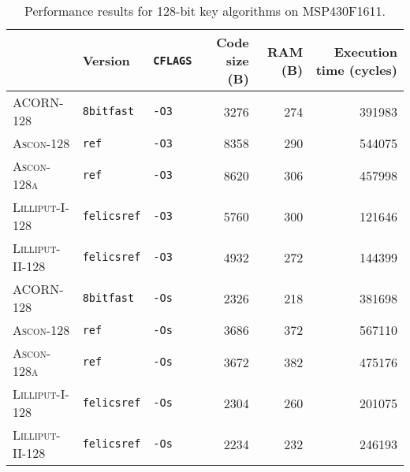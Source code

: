 \begin{table}[H]
  \centering
  \begin{tabular}{l|l|l||r|r|r}
      \textbf{}                & \textbf{Version}   & \textbf{\texttt{CFLAGS}} & \textbf{Code size (B)} & \textbf{RAM (B)} & \textbf{Execution time (cycles)} \\ \hline
      \textsc{ACORN-128}       & \texttt{8bitfast}  & \texttt{-O3}             &                   3276 &              274 &                           391983 \\ \hline
      \textsc{Ascon-128}       & \texttt{ref}       & \texttt{-O3}             &                   8358 &              290 &                           544075 \\ \hline
      \textsc{Ascon-128a}      & \texttt{ref}       & \texttt{-O3}             &                   8620 &              306 &                           457998 \\ \hline
      \textsc{Lilliput-I-128}  & \texttt{felicsref} & \texttt{-O3}             &                   5760 &              300 &                           121646 \\ \hline
      \textsc{Lilliput-II-128} & \texttt{felicsref} & \texttt{-O3}             &                   4932 &              272 &                           144399 \\ \hline
      \textsc{ACORN-128}       & \texttt{8bitfast}  & \texttt{-Os}             &                   2326 &              218 &                           381698 \\ \hline
      \textsc{Ascon-128}       & \texttt{ref}       & \texttt{-Os}             &                   3686 &              372 &                           567110 \\ \hline
      \textsc{Ascon-128a}      & \texttt{ref}       & \texttt{-Os}             &                   3672 &              382 &                           475176 \\ \hline
      \textsc{Lilliput-I-128}  & \texttt{felicsref} & \texttt{-Os}             &                   2304 &              260 &                           201075 \\ \hline
      \textsc{Lilliput-II-128} & \texttt{felicsref} & \texttt{-Os}             &                   2234 &              232 &                           246193 \\ \hline
  \end{tabular}
  \caption{Performance results for 128-bit key algorithms on MSP430F1611.}
  \label{table:results/128-msp}
\end{table}

